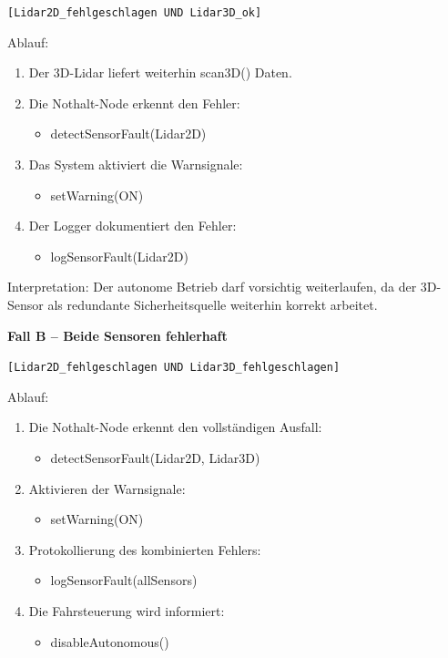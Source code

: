 \begin{description}
    \item[\texttt{[Lidar2D\_fehlgeschlagen UND Lidar3D\_ok]}]
\end{description}

\quad Ablauf:
\begin{enumerate}
    \item Der 3D-Lidar liefert weiterhin scan3D() Daten.
    \item Die Nothalt-Node erkennt den Fehler:
    \begin{itemize}
        \item detectSensorFault(Lidar2D)
    \end{itemize}
    \item Das System aktiviert die Warnsignale:
    \begin{itemize}
        \item setWarning(ON)
    \end{itemize}
    \item Der Logger dokumentiert den Fehler:
    \begin{itemize}
        \item logSensorFault(Lidar2D)
    \end{itemize}
\end{enumerate}

\quad Interpretation:  
Der autonome Betrieb darf vorsichtig weiterlaufen, da der 3D-Sensor als redundante Sicherheitsquelle weiterhin korrekt arbeitet.

\vspace{1em}

\textbf{Fall B – Beide Sensoren fehlerhaft}

\begin{description}
    \item[\texttt{[Lidar2D\_fehlgeschlagen UND Lidar3D\_fehlgeschlagen]}]
\end{description}

\quad Ablauf:
\begin{enumerate}
    \item Die Nothalt-Node erkennt den vollständigen Ausfall:
    \begin{itemize}
        \item detectSensorFault(Lidar2D, Lidar3D)
    \end{itemize}
    \item Aktivieren der Warnsignale:
    \begin{itemize}
        \item setWarning(ON)
    \end{itemize}
    \item Protokollierung des kombinierten Fehlers:
    \begin{itemize}
        \item logSensorFault(allSensors)
    \end{itemize}
    \item Die Fahrsteuerung wird informiert:
    \begin{itemize}
        \item disableAutonomous()
    \end{itemize}
\end{enumerate}


